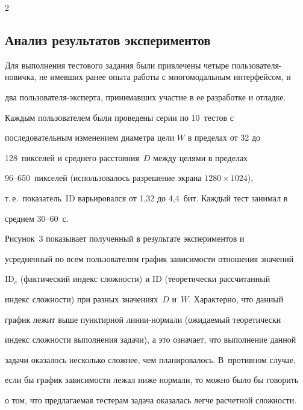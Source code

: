 \begin{multicols}{2}
\subsection{Анализ результатов экспериментов}





  Для выполнения тестового задания были привлечены четыре пользователя-новичка, не имевших ранее опыта работы с многомодальным интерфейсом, и 


два пользователя-эксперта, принимавших участие в ее разработке и отладке. 


Каждым пользователем были проведены серии по 10~тестов с 


последовательным изменением диаметра цели $W$ в пределах от 32 до 


128~пикселей и среднего расстояния~$D$ между целями в пределах 


  96--650~пикселей (использовалось разрешение экрана $1280\times1024$), 


т.\,е.\ показатель~ID варьировался от 1,32 до 4,4~бит. Каждый тест занимал в 


среднем 30--60~с.


  


  Рисунок~3 показывает полученный в результате экспериментов и 


усредненный по всем пользователям график зависимости отношения значений 


ID$_e$ (фактический индекс сложности) и ID (теоретически рассчитанный 


индекс сложности) при разных значениях~$D$ и~$W$. Характерно, что данный 


график лежит выше пунктирной ли\-нии-нор\-ма\-ли (ожи\-да\-емый теоретически 


индекс сложности выполнения задачи), а это означает, что выполнение данной 


задачи оказалось несколько сложнее, чем планировалось. В~противном случае, 


если бы график зависимости лежал ниже нормали, то можно было бы говорить 


о том, что предлагаемая тестерам задача оказалась легче расчетной сложности.





\begin{figure} %


 \vspace*{1pt}



\end{figure}
\end{multicols}
